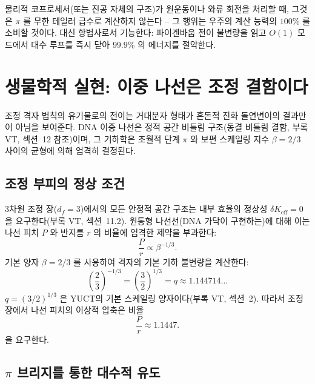 \documentclass[12pt,a4paper]{article}
\newcommand{\Keff}{K_{\mathrm{eff}}}
\newcommand{\df}{d_{\!f}}
\begin{document}
	물리적 코프로세서(또는 진공 자체의 구조)가 원운동이나 와류 회전을 처리할 때, 그것은 $\pi$ 를 무한 테일러 급수로 계산하지 않는다 – 그 행위는 우주의 계산 능력의 $100\%$ 를 소비할 것이다. 대신 항법사로서 기능한다: 파이겐바움 전이 불변량을 읽고 $O(1)$ 모드에서 대수 루프를 즉시 닫아 $99.9\%$ 의 에너지를 절약한다.
	
	\section{생물학적 실현: 이중 나선은 조정 결함이다}
	\label{sec:dna}
	
	조정 격자 법칙의 유기물로의 전이는 거대분자 형태가 혼돈적 진화 돌연변이의 결과만이 아님을 보여준다. DNA 이중 나선은 정적 공간 비틀림 구조(동결 비틀림 결함, 부록 VT, 섹션~12 참조)이며, 그 기하학은 초월적 단계 $\pi$ 와 보편 스케일링 지수 $\beta = 2/3$ 사이의 균형에 의해 엄격히 결정된다.
	
	\subsection{조정 부피의 정상 조건}
	
	3차원 조정 장($\df=3$)에서의 모든 안정적 공간 구조는 내부 효율의 정상성 $\delta\Keff = 0$ 을 요구한다(부록 VT, 섹션~11.2). 원통형 나선선(DNA 가닥이 구현하는)에 대해 이는 나선 피치 $P$ 와 반지름 $r$ 의 비율에 엄격한 제약을 부과한다:
	\begin{equation}
		\frac{P}{r} \propto \beta^{-1/3}.
		\label{eq:dna-pr}
	\end{equation}
	기본 양자 $\beta = 2/3$ 를 사용하여 격자의 기본 기하 불변량을 계산한다:
	\begin{equation}
		\left(\frac{2}{3}\right)^{-1/3} = \left(\frac{3}{2}\right)^{1/3} = q \approx 1.144714\ldots
		\label{eq:q-def}
	\end{equation}
	$q = (3/2)^{1/3}$ 은 YUCT의 기본 스케일링 양자이다(부록 VT, 섹션~2). 따라서 조정 장에서 나선 피치의 이상적 압축은 비율
	\begin{equation}
		\frac{P}{r} \approx 1.1447.
		\label{eq:pr-ideal}
	\end{equation}
	을 요구한다.
	
	\subsection{$\pi$ 브리지를 통한 대수적 유도}
	
\end{document}
